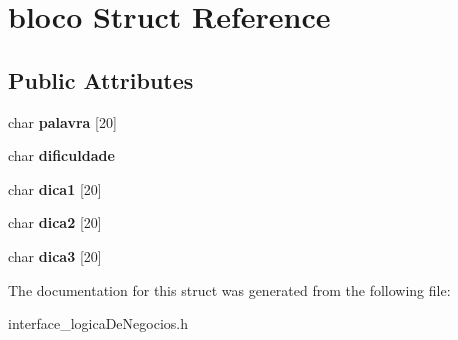 \hypertarget{structbloco}{\section{bloco Struct Reference}
\label{structbloco}
}
\subsection*{Public Attributes}
\begin{DoxyCompactItemize}
\item 
\hypertarget{structbloco_a4ddb53df6fd95b0c5299cd0713100b7e}{char {\bfseries palavra} \mbox{[}20\mbox{]}}\label{structbloco_a4ddb53df6fd95b0c5299cd0713100b7e}

\item 
\hypertarget{structbloco_a2451f3721788e13924f2090529314178}{char {\bfseries dificuldade}}\label{structbloco_a2451f3721788e13924f2090529314178}

\item 
\hypertarget{structbloco_a3f469ec402164f1ae837adb75a934b24}{char {\bfseries dica1} \mbox{[}20\mbox{]}}\label{structbloco_a3f469ec402164f1ae837adb75a934b24}

\item 
\hypertarget{structbloco_a570b7ab6ea4d2345fcce8be473c72193}{char {\bfseries dica2} \mbox{[}20\mbox{]}}\label{structbloco_a570b7ab6ea4d2345fcce8be473c72193}

\item 
\hypertarget{structbloco_a310193da7faffd540099a988a6e64553}{char {\bfseries dica3} \mbox{[}20\mbox{]}}\label{structbloco_a310193da7faffd540099a988a6e64553}

\end{DoxyCompactItemize}


The documentation for this struct was generated from the following file\-:\begin{DoxyCompactItemize}
\item 
interface\-\_\-logica\-De\-Negocios.\-h\end{DoxyCompactItemize}
